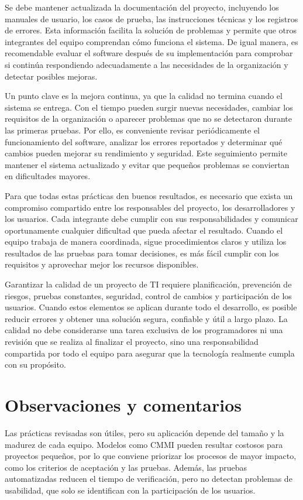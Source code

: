 \documentclass[12pt,letterpaper]{article}
\begin{document}
Se debe mantener actualizada la documentación del proyecto, incluyendo los manuales de usuario, los casos de prueba, las instrucciones técnicas y los registros de errores. Esta información facilita la solución de problemas y permite que otros integrantes del equipo comprendan cómo funciona el sistema. De igual manera, es recomendable evaluar el software después de su implementación para comprobar si continúa respondiendo adecuadamente a las necesidades de la organización y detectar posibles mejoras.

Un punto clave es la mejora continua, ya que la calidad no termina cuando el sistema se entrega. Con el tiempo pueden surgir nuevas necesidades, cambiar los requisitos de la organización o aparecer problemas que no se detectaron durante las primeras pruebas. Por ello, es conveniente revisar periódicamente el funcionamiento del software, analizar los errores reportados y determinar qué cambios pueden mejorar su rendimiento y seguridad. Este seguimiento permite mantener el sistema actualizado y evitar que pequeños problemas se conviertan en dificultades mayores.

Para que todas estas prácticas den buenos resultados, es necesario que exista un compromiso compartido entre los responsables del proyecto, los desarrolladores y los usuarios. Cada integrante debe cumplir con sus responsabilidades y comunicar oportunamente cualquier dificultad que pueda afectar el resultado. Cuando el equipo trabaja de manera coordinada, sigue procedimientos claros y utiliza los resultados de las pruebas para tomar decisiones, es más fácil cumplir con los requisitos y aprovechar mejor los recursos disponibles.

Garantizar la calidad de un proyecto de TI requiere planificación, prevención de riesgos, pruebas constantes, seguridad, control de cambios y participación de los usuarios. Cuando estos elementos se aplican durante todo el desarrollo, es posible reducir errores y obtener una solución segura, confiable y útil a largo plazo. La calidad no debe considerarse una tarea exclusiva de los programadores ni una revisión que se realiza al finalizar el proyecto, sino una responsabilidad compartida por todo el equipo para asegurar que la tecnología realmente cumpla con su propósito.


\section*{ Observaciones y comentarios}
Las prácticas revisadas son útiles, pero su aplicación depende del tamaño y la madurez de cada equipo. Modelos como CMMI pueden resultar costosos para proyectos pequeños, por lo que conviene priorizar los procesos de mayor impacto, como los criterios de aceptación y las pruebas. Además, las pruebas automatizadas reducen el tiempo de verificación, pero no detectan problemas de usabilidad, que solo se identifican con la participación de los usuarios.
\end{document}
